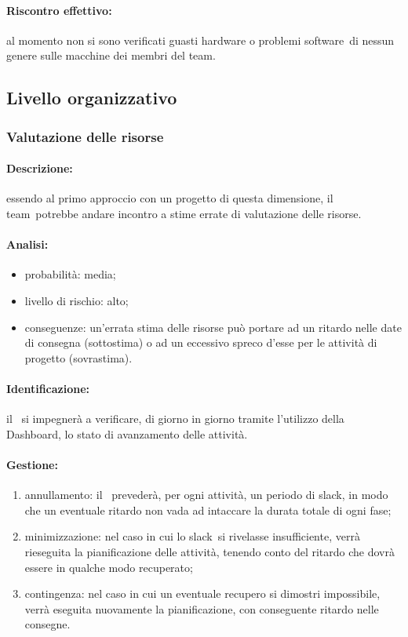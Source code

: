 \documentclass[../PianoProgetto.tex]{subfiles}
\begin{document}
	\paragraph*{Riscontro effettivo:} al momento non si sono verificati guasti hardware o problemi software\g\ di nessun genere sulle macchine dei membri del team\g .

\subsection{Livello organizzativo}

\subsubsection{Valutazione delle risorse}

	\paragraph*{Descrizione:} essendo al primo approccio con un progetto di questa dimensione, il team\g\ potrebbe andare incontro a stime errate di valutazione delle risorse.
	
	\paragraph*{Analisi:}
	\begin{itemize}
		\item probabilità: media;
		\item livello di rischio: alto;
		\item conseguenze: un'errata stima delle risorse può portare ad un ritardo nelle date di consegna (sottostima) o ad un eccessivo spreco d'esse per le attività di progetto (sovrastima).
	\end{itemize}
	
	\paragraph*{Identificazione:} il \responsabilediprogetto\ si impegnerà a verificare, di giorno in giorno tramite l'utilizzo della Dashboard\g, lo stato di avanzamento delle attività.
	
	\paragraph*{Gestione:}
	\begin{enumerate}
		\item annullamento: il \responsabilediprogetto\ prevederà, per ogni attività, un periodo di slack\g, in modo che un eventuale ritardo non vada ad intaccare la durata totale di ogni fase\g ;
		\item minimizzazione: nel caso in cui lo slack\g\ si rivelasse insufficiente, verrà rieseguita la pianificazione delle attività, tenendo conto del ritardo che dovrà essere in qualche modo recuperato;
		\item contingenza: nel caso in cui un eventuale recupero si dimostri impossibile, verrà eseguita nuovamente la pianificazione, con conseguente ritardo nelle consegne.
	\end{enumerate}	
	
\end{document}
